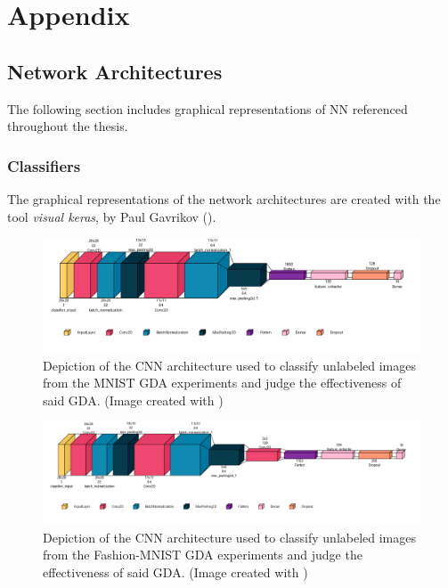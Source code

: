\section*{Appendix}\label{appendix}

\setcounter{page}{1}

\subsection{Network Architectures}
The following section includes graphical representations of NN referenced throughout the thesis. %

\subsubsection{Classifiers}\label{appendix_classifiers}
The graphical representations of the network architectures are created with the tool \textit{visual keras}, by Paul Gavrikov (\cite{Gavrikov2020VisualKeras}).

\begin{figure}[htbp]
    \centering
    \vspace{-.5em}
    \includegraphics[width=.9\textwidth]{abb/netron_network_archs/classifying_Classifier_MNIST.png}
    \caption{Depiction of the CNN architecture used to classify unlabeled images from the MNIST GDA experiments and judge the effectiveness of said GDA. (Image created with \cite{Gavrikov2020VisualKeras})}
    \label{fig:figure_class_mnist}
\end{figure}

\begin{figure}[htbp]
    \centering
    \vspace{-2em}
    \includegraphics[width=.9\textwidth]{abb/netron_network_archs/classifying_Classifier_FashionMNIST.png}
    \caption{Depiction of the CNN architecture used to classify unlabeled images from the Fashion-MNIST GDA experiments and judge the effectiveness of said GDA. (Image created with \cite{Gavrikov2020VisualKeras})}
    \label{fig:figure_class_fashion}
\end{figure}

